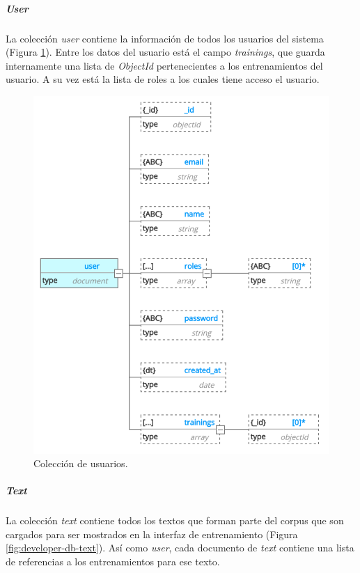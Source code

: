 \documentclass[12pt,a4paper,]{scrartcl}
\let\oldsubparagraph\subparagraph
\renewcommand{\subparagraph}[1]{\oldsubparagraph{#1}\mbox{}}
\begin{document}
\hypertarget{user}{%
\subparagraph{\texorpdfstring{\emph{User}}{User}}\label{user}}

La colección \emph{user} contiene la información de todos los usuarios del sistema (Figura \ref{fig:developer-db-user}). Entre los datos del usuario está el campo \emph{trainings}, que guarda internamente una lista de \emph{ObjectId} pertenecientes a los entrenamientos del usuario. A su vez está la lista de roles a los cuales tiene acceso el usuario.

\begin{figure}[H]

{\centering \includegraphics{assets/developer/db-user.pdf} 

}

\caption{Colección de usuarios.}\label{fig:developer-db-user}
\end{figure}

\hypertarget{text}{%
\subparagraph{\texorpdfstring{\emph{Text}}{Text}}\label{text}}

La colección \emph{text} contiene todos los textos que forman parte del corpus que son cargados para ser mostrados en la interfaz de entrenamiento (Figura \ref{fig:developer-db-text}). Así como \emph{user}, cada documento de \emph{text} contiene una lista de referencias a los entrenamientos para ese texto.
\end{document}
